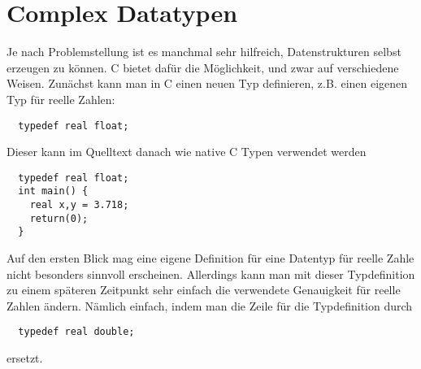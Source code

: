 \section{Complex Datatypen}

Je nach Problemstellung ist es manchmal sehr hilfreich, Datenstrukturen selbst erzeugen zu können.
C bietet dafür die Möglichkeit, und zwar auf verschiedene Weisen.
Zunächst kann man in C einen neuen Typ definieren, z.B. einen eigenen Typ für reelle Zahlen:
\begin{lstlisting}
  typedef real float;
\end{lstlisting}
Dieser kann im Quelltext danach wie native C Typen verwendet werden
\begin{lstlisting}
  typedef real float;
  int main() {
    real x,y = 3.718;
    return(0);
  }
\end{lstlisting}
Auf den ersten Blick mag eine eigene Definition für eine Datentyp für reelle Zahle nicht besonders sinnvoll erscheinen.
Allerdings kann man mit dieser Typdefinition zu einem späteren Zeitpunkt sehr einfach die verwendete Genauigkeit für reelle Zahlen ändern.
Nämlich einfach, indem man die Zeile für die Typdefinition durch
\begin{lstlisting}
  typedef real double;
\end{lstlisting}
ersetzt.

